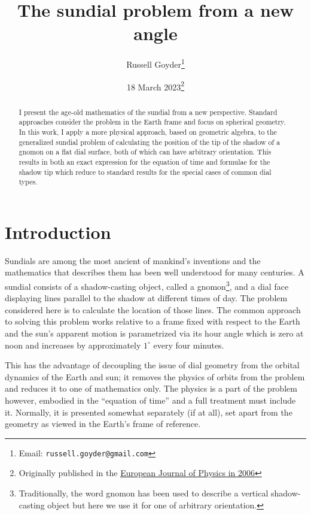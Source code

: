 \documentclass[12pt]{article}
\begin{document}
\title{The sundial problem from a new angle}
\author{Russell Goyder\footnote{Email: \texttt{russell.goyder@gmail.com}}}
\date{18 March 2023\footnote{Originally published in the \href{https://iopscience.iop.org/article/10.1088/0143-0807/27/2/023}{European Journal of Physics in 2006}}}
\maketitle

\begin{abstract}
  I present the age-old mathematics of the sundial from a new perspective. Standard approaches consider the problem in the Earth frame and focus on spherical geometry. In this work, I apply a more physical approach, based on geometric algebra, to the generalized sundial problem of calculating the position of the tip of the shadow of a gnomon on a flat dial surface, both of which can have arbitrary orientation. This results in both an exact expression for the equation of time and formulae for the shadow tip which reduce to standard results for the special cases of common dial types.
\end{abstract}

\section{Introduction}
%
Sundials are among the most ancient of mankind's inventions and the mathematics that describes them has been well understood for many centuries. A sundial consists of a shadow-casting object, called a gnomon\footnote{Traditionally, the word gnomon has been used to describe a vertical shadow-casting object but here we use it for one of arbitrary orientation.}, and a dial face displaying lines parallel to the shadow at different times of day. The problem considered here is to calculate the location of those lines. The common approach to solving this problem works relative to a frame fixed with respect to the Earth and the sun's apparent motion is parametrized via its hour angle which is zero at noon and increases by approximately $1^\circ$ every four minutes.

This has the advantage of decoupling the issue of dial geometry from the orbital dynamics of the Earth and sun; it removes the physics of orbits from the problem and reduces it to one of mathematics only. The physics is a part of the problem however, embodied in the ``equation of time'' and a full treatment must include it. Normally, it is presented somewhat separately (if at all), set apart from the geometry as viewed in the Earth's frame of reference.
\end{document}
